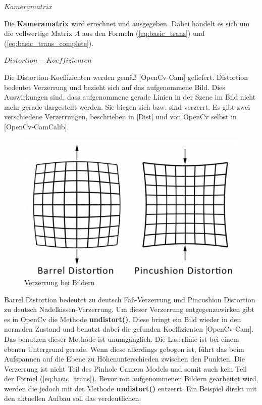 		$\underline{Kameramatrix}$
		
		Die \textbf{Kameramatrix} wird errechnet und ausgegeben. Dabei handelt es sich um die vollwertige Matrix \( A \) aus den Formeln (\ref{eq:basic_trans}) und (\ref{eq:basic_trans_complete}).
		
		$\underline{Distortion-Koeffizienten}$
		
		Die Distortion-Koeffizienten werden gemäß [OpenCv-Cam] geliefert. Distortion bedeutet Verzerrung und bezieht sich auf das aufgenommene Bild. Dies Auswirkungen sind, dass aufgenommene gerade Linien in der Szene im Bild nicht mehr gerade dargestellt werden. Sie biegen sich bzw. sind verzerrt. Es gibt zwei verschiedene Verzerrungen, beschrieben in [Dist] und von OpenCv selbst in [OpenCv-CamCalib].
		
		\begin{figure}[h]
			\centering
			\includegraphics[width=0.7\linewidth]{img/hauptteil/distortion.png}
			\caption[Verzerrung bei Bildern]{Verzerrung bei Bildern}
			\label{fig:distortion}
		\end{figure}
	
		Barrel Distortion bedeutet zu deutsch Faß-Verzerrung und Pincushion Distortion zu deutsch Nadelkissen-Verzerrung. Um dieser Verzerrung entgegenzuwirken gibt es in OpenCv die Methode \textbf{undistort()}. Diese bringt ein Bild wieder in den normalen Zustand und benutzt dabei die gefunden Koeffizienten [OpenCv-Cam]. Das benutzen dieser Methode ist unumgänglich. Die Laserlinie ist bei einem ebenen Untergrund gerade. Wenn diese allerdings gebogen ist, führt das beim Aufspannen auf die Ebene zu Höhenunterschieden zwischen den Punkten. Die Verzerrung ist nicht Teil des Pinhole Camera Models und somit auch kein Teil der Formel (\ref{eq:basic_trans}). Bevor mit aufgenommenen Bildern gearbeitet wird, werden die jedoch mit der Methode \textbf{undistort()} entzerrt. Ein Beispiel direkt mit den aktuellen Aufbau soll das verdeutlichen:
		
